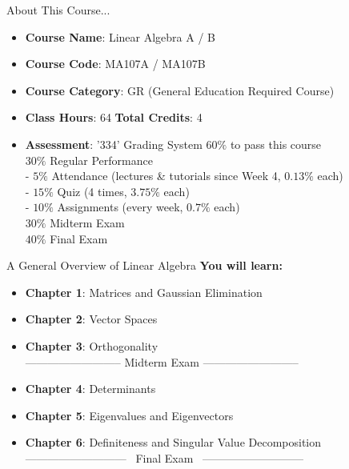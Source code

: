 \documentclass{beamer}
\begin{document}
\begin{frame}{About This Course...}
\begin{itemize}
    \item \textbf{Course Name}: Linear Algebra A / B
    \item \textbf{Course Code}: MA107A / MA107B
    \item \textbf{Course Category}: GR (General Education Required Course)
    \item \textbf{Class Hours}: 64 \qquad \textbf{Total Credits}: 4
    \item \textbf{Assessment}: '334' Grading System \quad $60\%$ to pass this course\\
        \vspace{5pt}
        $30\%$ Regular Performance\\
        \vspace{3pt}
        \quad - $5\%$ Attendance (lectures \& tutorials since Week 4, $0.13\%$ each)\\
        \vspace{3pt}
        \quad - $15\%$ Quiz (4 times, $3.75\%$ each)\\
        \vspace{3pt}
        \quad - $10\%$ Assignments (every week, $0.7\%$ each)\\
        \vspace{3pt}
        $30\%$ Midterm Exam \\
        \vspace{3pt}
        $40\%$ Final Exam
\end{itemize}

\end{frame}
\begin{frame}{A General Overview of Linear Algebra}
\textbf{You will learn:}
\begin{itemize}
    \item \textbf{Chapter 1}: Matrices and Gaussian Elimination
    \item \textbf{Chapter 2}: Vector Spaces
    \item \textbf{Chapter 3}: Orthogonality\\
    \vspace{4pt}
-------------------------- Midterm Exam --------------------------
    \item \textbf{Chapter 4}: Determinants
    \item \textbf{Chapter 5}: Eigenvalues and Eigenvectors
    \item \textbf{Chapter 6}: Definiteness and Singular Value Decomposition
    \\
    \vspace{4pt}
--------------------------- \ Final Exam \ ---------------------------
\end{itemize}
\end{frame}
\end{document}
